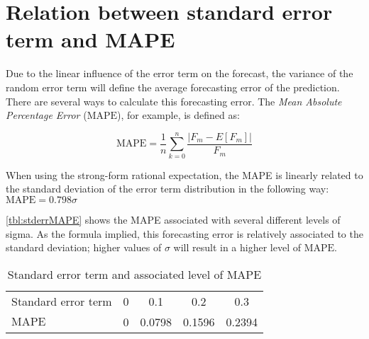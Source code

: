 \chapter{Relation between standard error term and MAPE}
\label{app:errorMAPE}
Due to the linear influence of the error term on the forecast, the variance of the random error term will define the average forecasting error of the prediction. There are several ways to calculate this forecasting error. The \emph{Mean Absolute Percentage Error} ($\mbox{MAPE}$), for example, is defined as:

$$ \mbox{MAPE} = \frac{1}{n} \sum\limits_{k=0}^n \frac{|F_m - E[F_m]|}{F_m} $$

When using the strong-form rational expectation, the MAPE is linearly related to the standard deviation of the error term distribution in the following way: $ \mbox{MAPE} = 0.798 \sigma $

\autoref{tbl:stderrMAPE} shows the MAPE associated with several different levels of sigma. As the formula implied, this forecasting error is relatively associated to the standard deviation; higher values of $\sigma$ will result in a higher level of $\mbox{MAPE}$.


\begin{table}[h]
\centering
\begin{tabular}{l c c c c}
\toprule

Standard error term  &  0  &  0.1  &  0.2  &  0.3  \\
$\mbox{MAPE}$        &  0  &  0.0798  &  0.1596  &  0.2394  \\
\bottomrule
\end{tabular}
\caption{Standard error term and associated level of MAPE}
\label{tbl:stderrMAPE}
\end{table}



